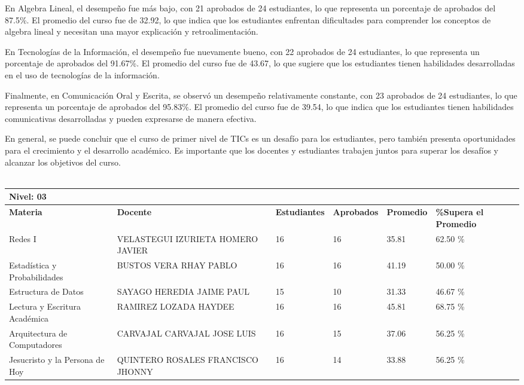 En Algebra Lineal, el desempeño fue más bajo, con 21 aprobados de 24 estudiantes, lo que representa un porcentaje de aprobados del 87.5\%. El promedio del curso fue de 32.92, lo que indica que los estudiantes enfrentan dificultades para comprender los conceptos de algebra lineal y necesitan una mayor explicación y retroalimentación.

En Tecnologías de la Información, el desempeño fue nuevamente bueno, con 22 aprobados de 24 estudiantes, lo que representa un porcentaje de aprobados del 91.67\%. El promedio del curso fue de 43.67, lo que sugiere que los estudiantes tienen habilidades desarrolladas en el uso de tecnologías de la información.

Finalmente, en Comunicación Oral y Escrita, se observó un desempeño relativamente constante, con 23 aprobados de 24 estudiantes, lo que representa un porcentaje de aprobados del 95.83\%. El promedio del curso fue de 39.54, lo que indica que los estudiantes tienen habilidades comunicativas desarrolladas y pueden expresarse de manera efectiva.

En general, se puede concluir que el curso de primer nivel de TICs es un desafío para los estudiantes, pero también presenta oportunidades para el crecimiento y el desarrollo académico. Es importante que los docentes y estudiantes trabajen juntos para superar los desafíos y alcanzar los objetivos del curso.\\
\vspace{1cm}\\\small
\begin{tabularx}{\textwidth}{|p{2.5cm}|p{2.5cm}|X|X|X|X|}
\hline
\multicolumn{6}{|X|}{\textbf{Nivel: 03 }}\\\hline\textbf{Materia} & \textbf{Docente} & \textbf{Estudiantes} & \textbf{Aprobados} & \textbf{Promedio} & \textbf{\%Supera el Promedio} \\ \hline
Redes I & VELASTEGUI IZURIETA HOMERO JAVIER & 16 & 16 & 35.81 & 62.50 \%\\ \hline
Estadística y Probabilidades & BUSTOS VERA RHAY PABLO & 16 & 16 & 41.19 & 50.00 \%\\ \hline
Estructura de Datos & SAYAGO HEREDIA JAIME PAUL & 15 & 10 & 31.33 & 46.67 \%\\ \hline
Lectura y Escritura Académica & RAMIREZ LOZADA HAYDEE  & 16 & 16 & 45.81 & 68.75 \%\\ \hline
Arquitectura de Computadores & CARVAJAL CARVAJAL JOSE LUIS & 16 & 15 & 37.06 & 56.25 \%\\ \hline
Jesucristo y la Persona de Hoy & QUINTERO ROSALES FRANCISCO JHONNY & 16 & 14 & 33.88 & 56.25 \%\\ \hline
\end{tabularx}

